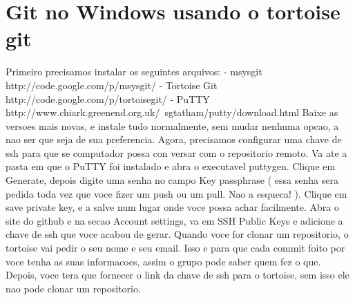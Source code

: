 \documentclass[12pt,onecolumn]{article}
\begin{document}
\section{Git no Windows usando o tortoise git}
    Primeiro precisamos instalar os seguintes arquivos:
    - msysgit       http://code.google.com/p/msysgit/
    - Tortoise Git  http://code.google.com/p/tortoisegit/
    - PuTTY         http://www.chiark.greenend.org.uk/~sgtatham/putty/download.html
Baixe as versoes mais novas, e instale tudo normalmente, sem mudar nenhuma opcao,
a nao ser que seja de sua preferencia.
Agora, precisamos configurar uma chave de ssh para que se computador possa con
versar com o repositorio remoto. Va ate a pasta em que o PuTTY foi instalado e 
abra o executavel puttygen. Clique em Generate, depois digite uma senha no campo
Key passphrase ( essa senha sera pedida toda vez que voce fizer um push ou um 
pull. Nao a esqueca! ). Clique em save private key, e a salve num lugar onde 
voce possa achar facilmente. Abra o site do github e na secao Account settings,
va em SSH Public Keys e adicione a chave de ssh que voce acabou de gerar.
Quando voce for clonar um repositorio, o tortoise vai pedir o seu nome e seu email.
Isso e para que cada commit foito por voce tenha as suas informacoes, assim
o grupo pode saber quem fez o que. Depois, voce tera que fornecer o link da chave 
de ssh para o tortoise, sem isso ele nao pode clonar um repositorio.
\end{document}
